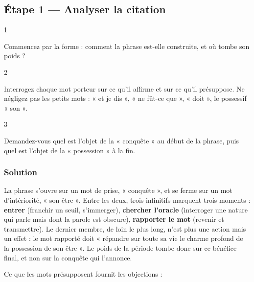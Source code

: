 \documentclass[11pt,a4paper]{article}
\begin{document}
\hypertarget{uxe9tape-1-analyser-la-citation}{%
\subsection{Étape 1 --- Analyser la citation}\label{uxe9tape-1-analyser-la-citation}}

\begin{indication}{1}

Commencez par la forme : comment la phrase est-elle construite, et où tombe son poids ?

\end{indication}

\begin{indication}{2}

Interrogez chaque mot porteur sur ce qu'il affirme et sur ce qu'il présuppose. Ne négligez pas les petits mots : « et je dis », « ne fût-ce que », « doit », le possessif « son ».

\end{indication}

\begin{indication}{3}

Demandez-vous quel est l'objet de la « conquête » au début de la phrase, puis quel est l'objet de la « possession » à la fin.

\end{indication}

\hypertarget{solution}{%
\subsubsection{Solution}\label{solution}}

La phrase s'ouvre sur un mot de prise, « conquête », et se ferme sur un mot d'intériorité, « son être ». Entre les deux, trois infinitifs marquent trois moments : \textbf{entrer} (franchir un seuil, s'immerger), \textbf{chercher l'oracle} (interroger une nature qui parle mais dont la parole est obscure), \textbf{rapporter le mot} (revenir et transmettre). Le dernier membre, de loin le plus long, n'est plus une action mais un effet : le mot rapporté doit « répandre sur toute sa vie le charme profond de la possession de son être ». Le poids de la période tombe donc sur ce bénéfice final, et non sur la conquête qui l'annonce.

Ce que les mots présupposent fournit les objections :
\end{document}
